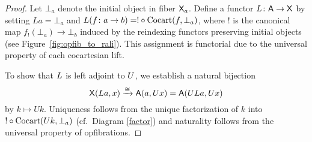 \documentclass{amsart}
\begin{document}
\begin{proof}
  Let $\bot_a$ denote the initial object in fiber $\mathsf{X}_a$. Define a
  functor $L \colon \mathsf{A} \to \mathsf{X}$ by setting $La = \bot_a$ and $L(f \colon a \to b) = ! \circ \mathrm{Cocart}(f,\bot_a)$, where $!$ is the canonical map $f_!(\bot_a) \to \bot_b$ induced by the reindexing functors preserving initial objects (see Figure~\ref{fig:opfib_to_rali}). This assignment is functorial due to the universal property of each cocartesian lift.
  
  \begin{figure}
\end{figure}

To show that $L$ is left adjoint to $U$, we establish a natural bijection $$\mathsf{X}(L a,x) \xrightarrow{\cong} \mathsf{A}(a,U x) = \mathsf{A}(ULa,Ux)$$ by $k \mapsto Uk$. Uniqueness follows from the unique factorization of $k$ into $! \circ \mathrm{Cocart} (Uk,\bot_a)$ (cf.~Diagram \ref{factor}) and naturality follows from the universal property of opfibrations.


\end{proof}
\end{document}
